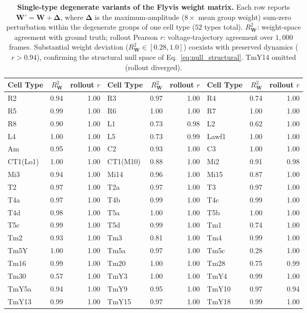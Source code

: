 \begin{table}[ht!]
\centering\scriptsize
\begin{tabular}{lrr@{\quad}lrr@{\quad}lrr}
\toprule
Cell Type & $R^2_{\mathbf{W}}$ & rollout $r$ &Cell Type & $R^2_{\mathbf{W}}$ & rollout $r$ & Cell Type & $R^2_{\mathbf{W}}$ & rollout $r$ \\
\midrule
R2         & 0.94 & 1.00 & R3         & 0.97 & 1.00 & R4         & 0.74 & 1.00 \\
R5         & 0.99 & 1.00 & R6         & 1.00 & 1.00 & R7         & 1.00 & 1.00 \\
R8         & 0.90 & 1.00 & L1         & 0.73 & 0.98 & L2         & 0.62 & 1.00 \\
L4         & 1.00 & 1.00 & L5         & 0.73 & 0.99 & Lawf1      & 1.00 & 1.00 \\
Am         & 0.95 & 1.00 & C2         & 0.93 & 1.00 & C3         & 1.00 & 1.00 \\
CT1(Lo1)   & 1.00 & 1.00 & CT1(M10)   & 0.88 & 1.00 & Mi2        & 0.91 & 0.98 \\
Mi3        & 0.94 & 1.00 & Mi14       & 0.96 & 1.00 & Mi15       & 0.87 & 1.00 \\
T2         & 0.97 & 1.00 & T2a        & 0.97 & 1.00 & T3         & 0.97 & 1.00 \\
T4a        & 0.97 & 1.00 & T4b        & 0.99 & 1.00 & T4c        & 0.99 & 1.00 \\
T4d        & 0.98 & 1.00 & T5a        & 1.00 & 1.00 & T5b        & 1.00 & 1.00 \\
T5c        & 0.99 & 1.00 & T5d        & 0.99 & 1.00 & Tm1        & 0.74 & 1.00 \\
Tm2        & 0.93 & 1.00 & Tm3        & 0.81 & 1.00 & Tm4        & 0.99 & 1.00 \\
Tm5Y       & 1.00 & 1.00 & Tm5a       & 0.97 & 1.00 & Tm5c       & 0.28 & 1.00 \\
Tm16       & 0.99 & 1.00 & Tm20       & 1.00 & 1.00 & Tm28       & 0.75 & 0.99 \\
Tm30       & 0.57 & 1.00 & TmY3       & 1.00 & 1.00 & TmY4       & 0.99 & 1.00 \\
TmY5a      & 0.94 & 1.00 & TmY9       & 0.95 & 1.00 & TmY10      & 0.97 & 0.94 \\
TmY13      & 0.99 & 1.00 & TmY15      & 0.97 & 1.00 & TmY18      & 0.99 & 1.00 \\
\bottomrule
\end{tabular}
\caption{\textbf{Single-type degenerate variants of the Flyvis weight
matrix.} Each row reports $\mathbf{W}' = \mathbf{W} +
\boldsymbol{\Delta}$, where $\boldsymbol{\Delta}$ is the
maximum-amplitude ($8\times$ mean group weight) sum-zero perturbation
within the degenerate groups of one cell type ($52$ types total).
$R^2_{\mathbf{W}}$: weight-space agreement with ground truth; rollout
Pearson $r$: voltage-trajectory agreement over $1{,}000$ frames.
Substantial weight deviation ($R^2_{\mathbf{W}}\in[0.28,1.0]$) coexists
with preserved dynamics ($r>0.94$), confirming the structural null
space of Eq.~\eqref{eq:null_structural}. TmY14 omitted (rollout
diverged).}

\label{tab:lambda_8}
\end{table}